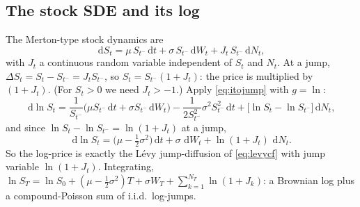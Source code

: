 \documentclass[11pt]{article}
\newcommand{\dd}{\,\mathrm{d}}
\begin{document}
\subsection{The stock SDE and its log}
The Merton-type stock dynamics are
\begin{equation}\label{eq:stocksde}
\dd S_t=\mu\,S_{t^-}\dd t+\sigma\,S_{t^-}\dd W_t+J_t\,S_{t^-}\dd N_t,
\end{equation}
with $J_t$ a continuous random variable independent of $S_t$ and $N_t$. At a jump,
$\Delta S_t=S_t-S_{t^-}=J_t S_{t^-}$, so $S_t=S_{t^-}(1+J_t)$: the price is multiplied by $(1+J_t)$.
(For $S_t>0$ we need $J_t>-1$.) Apply \eqref{eq:itojump} with $g=\ln$:
\[
\dd\ln S_t
=\frac{1}{S_{t^-}}\big(\mu S_{t^-}\dd t+\sigma S_{t^-}\dd W_t\big)
-\frac{1}{2S_{t^-}^2}\sigma^2S_{t^-}^2\dd t
+\big[\ln S_t-\ln S_{t^-}\big]\dd N_t,
\]
and since $\ln S_t-\ln S_{t^-}=\ln(1+J_t)$ at a jump,
\begin{equation}\label{eq:logsde}
\dd\ln S_t=\Big(\mu-\tfrac12\sigma^2\Big)\dd t+\sigma\,\dd W_t+\ln(1+J_t)\,\dd N_t.
\end{equation}
So the log-price is exactly the L\'evy jump-diffusion of \eqref{eq:levycf} with jump variable
$\ln(1+J_t)$. Integrating, $\ln S_T=\ln S_0+(\mu-\tfrac12\sigma^2)T+\sigma W_T+\sum_{k=1}^{N_T}\ln(1+J_k)$:
a Brownian log plus a compound-Poisson sum of i.i.d.\ log-jumps.
\end{document}
